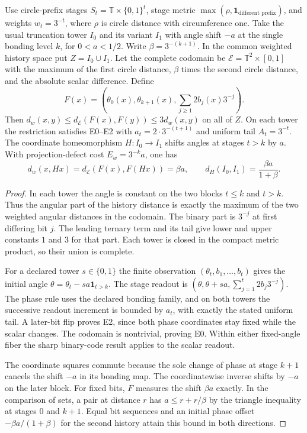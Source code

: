 \begin{theorem}\label{thm:joint-transport-readout}
Use circle-prefix stages $S_t=\mathbb T\times\{0,1\}^t$, stage metric $\max(\rho,\mathbf{1}_{\text{different prefix}})$, and weights $w_t=3^{-t}$, where $\rho$ is circle distance with circumference one. Take the usual truncation tower $I_0$ and its variant $I_1$ with angle shift $-a$ at the single bonding level $k$, for $0<a<1/2$. Write $\beta=3^{-(k+1)}$. In the common weighted history space put $Z=I_0\cup I_1$. Let the complete codomain be $\mathcal E=\mathbb T^2\times[0,1]$ with the maximum of the first circle distance, $\beta$ times the second circle distance, and the absolute scalar difference. Define
\[
 F(x)=\left(\theta_0(x),\theta_{k+1}(x),\sum_{j\geq1}2b_j(x)3^{-j}\right).
\]
Then $d_w(x,y)\leq d_{\mathcal E}(F(x),F(y))\leq3d_w(x,y)$ on all of $Z$. On each tower the restriction satisfies E0--E2 with $a_t=2\cdot3^{-(t+1)}$ and uniform tail $A_t=3^{-t}$. The coordinate homeomorphism $H:I_0\to I_1$ shifts angles at stages $t>k$ by $a$. With projection-defect cost $E_w=3^{-k}a$, one has
\[
 d_w(x,Hx)=d_{\mathcal E}(F(x),F(Hx))=\beta a,\qquad
 d_H(I_0,I_1)=\frac{\beta a}{1+\beta}.
\]
\end{theorem}
\begin{proof}
In each tower the angle is constant on the two blocks $t\le k$ and $t>k$. Thus the angular part of the history distance is exactly the maximum of the two weighted angular distances in the codomain. The binary part is $3^{-j}$ at first differing bit $j$. The leading ternary term and its tail give lower and upper constants $1$ and $3$ for that part. Each tower is closed in the compact metric product, so their union is complete.

For a declared tower $s\in\{0,1\}$ the finite observation $(\theta_t,b_1,\ldots,b_t)$ gives the initial angle $\theta=\theta_t-sa\mathbf 1_{t>k}$. The stage readout is $(\theta,\theta+sa,\sum_{j=1}^t2b_j3^{-j})$. The phase rule uses the declared bonding family, and on both towers the successive readout increment is bounded by $a_t$, with exactly the stated uniform tail. A later-bit flip proves E2, since both phase coordinates stay fixed while the scalar changes. The codomain is nontrivial, proving E0. Within either fixed-angle fiber the sharp binary-code result applies to the scalar readout.

The coordinate squares commute because the sole change of phase at stage $k+1$ cancels the shift $-a$ in its bonding map. The coordinatewise inverse shifts by $-a$ on the later block. For fixed bits, $F$ measures the shift $\beta a$ exactly. In the comparison of sets, a pair at distance $r$ has $a\leq r+r/\beta$ by the triangle inequality at stages $0$ and $k+1$. Equal bit sequences and an initial phase offset $-\beta a/(1+\beta)$ for the second history attain this bound in both directions.
\end{proof}


